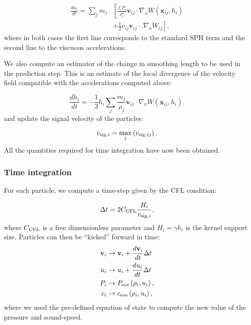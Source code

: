 \documentclass[fleqn, usenatbib, useAMS, a4paper]{mnras}
\renewcommand{\vec}[1]{{\mathbf{#1}}}
\newcommand{\Wij}{\overline{\nabla_xW_{ij}}}
\begin{document}
\begin{align}
  \frac{du_i}{dt} = \sum_j m_j &\left[\frac{f_iP_i}{\rho_i^2}  \vec{v}_{ij}
    \cdot \nabla_x W(\vec{x}_{ij}, h_i) \right. \label{eq:sph:minimal:du_dt}\\
    &+\left. \frac{1}{2}\nu_{ij}\vec{v}_{ij}\cdot\Big. \Wij\right], \nonumber
\end{align}
where in both cases the first line corresponds to the standard SPH
term and the second line to the viscuous accelerations.

We also compute an estimator of the change in smoothing length to be
used in the prediction step. This is an estimate of the local
divergence of the velocity field compatible with the accelerations
computed above:

\begin{equation}
  \frac{dh_i}{dt} = -\frac{1}{3}h_i \sum_j \frac{m_j}{\rho_j}
  \vec{v}_{ij}\cdot \nabla_x W(\vec{x}_{ij}, h_i).
  \label{eq:sph:minimal:dh_dt}
\end{equation}
and update the signal velocity of the particles:

\begin{equation}
  v_{{\rm sig},i} = \max_j \left( v_{{\rm sig},ij} \right).
  \label{eq:sph:minimal:v_sig_update}
\end{equation}
All the quantities required for time integration have now been obtained.

\subsubsection{Time integration}

For each particle, we compute a time-step given by the CFL condition:

\begin{equation}
  \Delta t = 2 C_{\rm CFL} \frac{H_i}{v_{{\rm sig},i}},
    \label{eq:sph:minimal:dt}
\end{equation}
where $C_{\rm CFL}$ is a free dimensionless parameter and $H_i = \gamma h_i$ is the
kernel support size. Particles can then be ``kicked'' forward in time:
\begin{align}
  \vec{v}_i &\rightarrow \vec{v}_i + \frac{d\vec{v}_i}{dt} \Delta t  \label{eq:sph:minimal:kick_v}\\
  u_i &\rightarrow u_i + \frac{du_i}{dt} \Delta t \label{eq:sph:minimal:kick_u}\\
  P_i &\rightarrow P_{\rm eos}\left(\rho_i, u_i\right) \label{eq:sph:minimal:kick_P}, \\
  c_i &\rightarrow c_{\rm eos}\left(\rho_i, u_i\right) \label{eq:sph:minimal:kick_c},
\end{align}
where we used the pre-defined equation of state to compute the new
value of the pressure and sound-speed.
\end{document}
